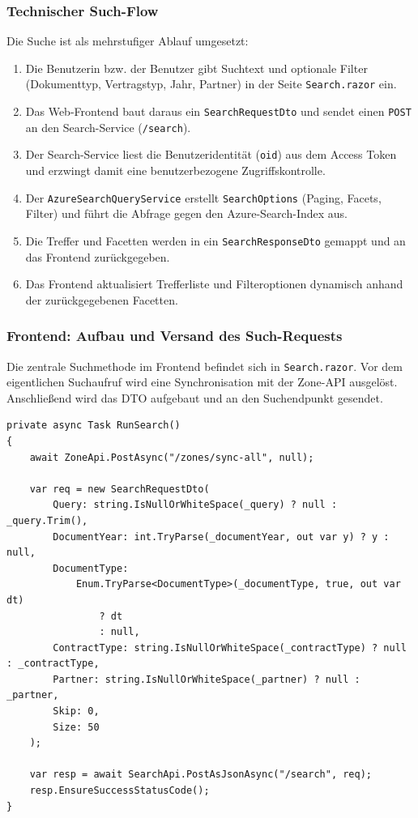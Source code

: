 \subsubsection{Technischer Such-Flow}

Die Suche ist als mehrstufiger Ablauf umgesetzt:
\begin{enumerate}
    \item Die Benutzerin bzw. der Benutzer gibt Suchtext und optionale Filter (Dokumenttyp, Vertragstyp, Jahr, Partner) in der Seite \texttt{Search.razor} ein.
    \item Das Web-Frontend baut daraus ein \texttt{SearchRequestDto} und sendet einen \texttt{POST} an den Search-Service (\texttt{/search}).
    \item Der Search-Service liest die Benutzeridentität (\texttt{oid}) aus dem Access Token und erzwingt damit eine benutzerbezogene Zugriffskontrolle.
    \item Der \texttt{AzureSearchQueryService} erstellt \texttt{SearchOptions} (Paging, Facets, Filter) und führt die Abfrage gegen den Azure-Search-Index aus.
    \item Die Treffer und Facetten werden in ein \texttt{SearchResponseDto} gemappt und an das Frontend zurückgegeben.
    \item Das Frontend aktualisiert Trefferliste und Filteroptionen dynamisch anhand der zurückgegebenen Facetten.
\end{enumerate}

\subsubsection{Frontend: Aufbau und Versand des Such-Requests}

Die zentrale Suchmethode im Frontend befindet sich in \texttt{Search.razor}. Vor dem eigentlichen Suchaufruf wird eine Synchronisation mit der Zone-API ausgelöst. Anschließend wird das DTO aufgebaut und an den Suchendpunkt gesendet.

\begin{lstlisting}[language={[Sharp]C},caption={Suchen im Frontend mit DTO-Aufbau und API-Aufruf},label={lst:search-frontend-request}]
private async Task RunSearch()
{
    await ZoneApi.PostAsync("/zones/sync-all", null);

    var req = new SearchRequestDto(
        Query: string.IsNullOrWhiteSpace(_query) ? null : _query.Trim(),
        DocumentYear: int.TryParse(_documentYear, out var y) ? y : null,
        DocumentType:
            Enum.TryParse<DocumentType>(_documentType, true, out var dt)
                ? dt
                : null,
        ContractType: string.IsNullOrWhiteSpace(_contractType) ? null : _contractType,
        Partner: string.IsNullOrWhiteSpace(_partner) ? null : _partner,
        Skip: 0,
        Size: 50
    );

    var resp = await SearchApi.PostAsJsonAsync("/search", req);
    resp.EnsureSuccessStatusCode();
}
\end{lstlisting}

